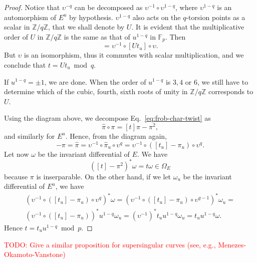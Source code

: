 \documentclass[12pt]{article}
\theoremstyle{plain}
\theoremstyle{definition}
\newcommand{\todo}[1]{\textcolor{red}{TODO: #1}}
\def\Z{\ensuremath{\mathbb{Z}}}
\def\F{\ensuremath{\mathbb{F}}}
\begin{document}
\begin{proof}
  Notice that $\upsilon^{-q}$ can be decomposed as
  $\upsilon^{-1}\circ\upsilon^{1-q}$, where $\upsilon^{1-q}$ is an
  automorphism of $E^u$ by hypothesis. $\upsilon^{1-q}$ also acts on
  the $q$-torsion points as a scalar in $\Z/q\Z$, that we shall denote
  by $U$. It is evident that the multiplicative order of $U$ in $\Z/q\Z$
  is the same as that of $u^{1-q}$ in $\F_p$. Then
  \begin{equation*}
    [t] = \upsilon^{-1}\circ[Ut_u]\circ\upsilon.
  \end{equation*}
  But $\upsilon$ is an isomorphism, thus it commutes with scalar
  multiplication, and we conclude that $t=Ut_u\bmod q$.

  If $u^{1-q}=\pm1$, we are done. When the order of $u^{1-q}$ is $3,4$
  or $6$, we still have to determine which of the cubic, fourth, sixth
  roots of unity in $\Z/q\Z$ corresponds to $U$.

  Using the diagram above, we decompose
  Eq.~\eqref{eq:frob-char-twist} as
  \begin{equation*}
    \hat\pi\circ\pi = [t]\pi - \pi^2,
  \end{equation*}
  and similarly for $E^u$. Hence, from the diagram again,
  \begin{equation*}
    [t] - \pi = \hat\pi = \upsilon^{-1}\circ\hat\pi_u\circ\upsilon^q 
    =  \upsilon^{-1}\circ([t_u] - \pi_u)\circ\upsilon^q.
  \end{equation*}
  Let now $\omega$ be the invariant differential of $E$. We have
  \begin{equation*}
    ([t]-\pi^2)^\ast\omega = t\omega\in\Omega_E
  \end{equation*}
  because $\pi$ is inserparable. On the other hand, if we let
  $\omega_u$ be the invariant differential of $E^u$, we have
  \begin{multline*}
    (\upsilon^{-1}\circ([t_u] - \pi_u)\circ\upsilon^q)^\ast\omega =
    (\upsilon^{-1}\circ([t_u] - \pi_u)\circ\upsilon^{q-1})^\ast\omega_u =\\
    (\upsilon^{-1}\circ([t_u] - \pi_u))^\ast u^{1-q}\omega_u =
    (\upsilon^{-1})^\ast t_uu^{1-q}\omega_u =
    t_uu^{1-q}\omega.
  \end{multline*}
  Hence $t = t_uu^{1-q} \bmod p$.
\end{proof}

\todo{Give a similar proposition for supersingular curves (see, e.g.,
  Menezes-Okamoto-Vanstone)}




\end{document}
